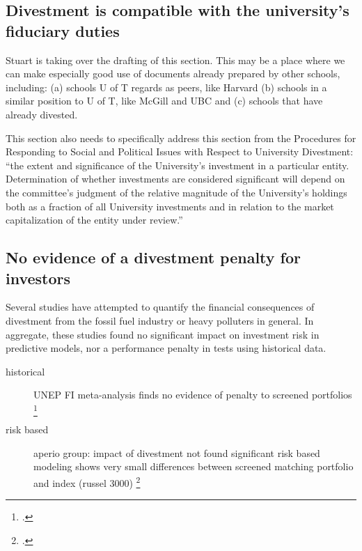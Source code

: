 


		\begin{samepage}
		\section {Divestment is compatible with the university's fiduciary duties}

\begin{vcom}
	Stuart is taking over the drafting of this section. This may be a place where we can make especially good use of documents already prepared by other schools, including: (a) schools U of T regards as peers, like Harvard (b) schools in a similar position to U of T, like McGill and UBC and (c) schools that have already divested.
\end{vcom}

\begin{vcom}
	This section also needs to specifically address this section from the Procedures for Responding to Social and Political Issues with Respect to University Divestment: ``the extent and significance of the University’s investment in a particular entity.  Determination of whether investments are considered significant will depend on the committee's judgment of the relative magnitude of the University’s holdings both as a fraction of all University investments and in relation to the market capitalization of the entity under review.''
\end{vcom}


	\subsection {No evidence of a divestment penalty for investors}
	
Several studies have attempted to quantify the financial consequences of divestment from the fossil fuel industry or heavy polluters in general. 
In aggregate, these studies found no significant impact on investment risk in predictive models, nor a performance penalty in tests using historical data.
\begin{description}
\item[historical] UNEP FI meta-analysis finds no evidence of penalty to screened portfolios \footcite{UNEPFI2007}
\item[risk based] aperio group: impact of divestment not found significant risk based modeling shows very small differences between screened matching portfolio and index (russel 3000) \footcite{Aperio2013}
\end{description}



\end{samepage}
